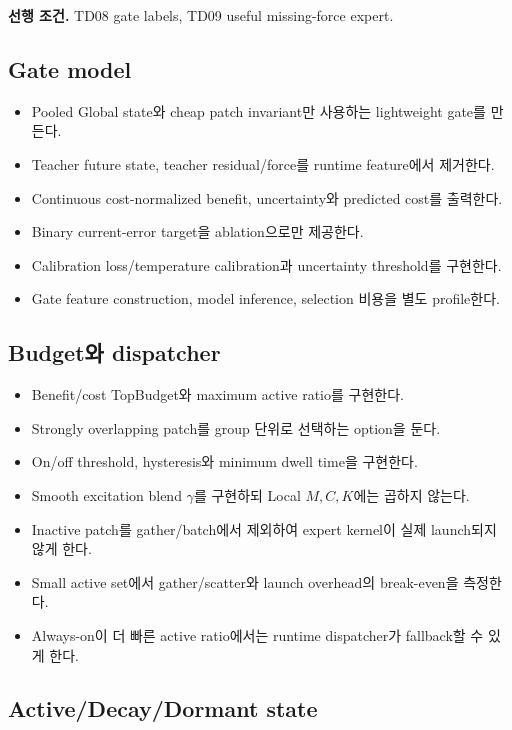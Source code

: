 \documentclass[10pt,a4paper]{article}
\newcommand{\todo}{\textcolor{TodoGray}{\(\square\)}}
\begin{document}
\textbf{선행 조건.} TD08 gate labels, TD09 useful missing-force expert.

\subsection*{Gate model}

\begin{itemize}
  \item[\todo] Pooled Global state와 cheap patch invariant만 사용하는 lightweight gate를 만든다.
  \item[\todo] Teacher future state, teacher residual/force를 runtime feature에서 제거한다.
  \item[\todo] Continuous cost-normalized benefit, uncertainty와 predicted cost를 출력한다.
  \item[\todo] Binary current-error target을 ablation으로만 제공한다.
  \item[\todo] Calibration loss/temperature calibration과 uncertainty threshold를 구현한다.
  \item[\todo] Gate feature construction, model inference, selection 비용을 별도 profile한다.
\end{itemize}

\subsection*{Budget와 dispatcher}

\begin{itemize}
  \item[\todo] Benefit/cost TopBudget와 maximum active ratio를 구현한다.
  \item[\todo] Strongly overlapping patch를 group 단위로 선택하는 option을 둔다.
  \item[\todo] On/off threshold, hysteresis와 minimum dwell time을 구현한다.
  \item[\todo] Smooth excitation blend \(\gamma\)를 구현하되 Local \(M,C,K\)에는 곱하지 않는다.
  \item[\todo] Inactive patch를 gather/batch에서 제외하여 expert kernel이 실제 launch되지 않게 한다.
  \item[\todo] Small active set에서 gather/scatter와 launch overhead의 break-even을 측정한다.
  \item[\todo] Always-on이 더 빠른 active ratio에서는 runtime dispatcher가 fallback할 수 있게 한다.
\end{itemize}

\subsection*{Active/Decay/Dormant state}
\end{document}
